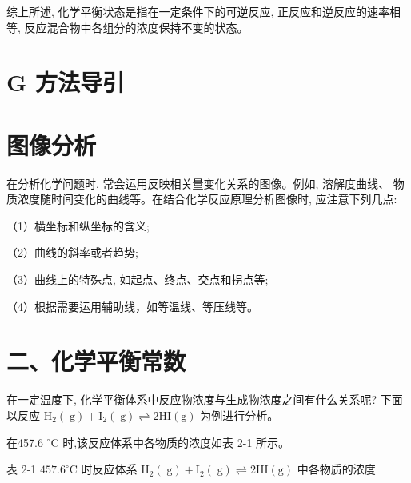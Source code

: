 \documentclass[10pt]{article}
\begin{document}
综上所述, 化学平衡状态是指在一定条件下的可逆反应, 正反应和逆反应的速率相等, 反应混合物中各组分的浓度保持不变的状态。

\section*{G 方法导引}

\section*{图像分析}

在分析化学问题时, 常会运用反映相关量变化关系的图像。例如, 溶解度曲线、 物质浓度随时间变化的曲线等。在结合化学反应原理分析图像时, 应注意下列几点:

（1）横坐标和纵坐标的含义;

（2）曲线的斜率或者趋势;

（3）曲线上的特殊点, 如起点、终点、交点和拐点等;

（4）根据需要运用辅助线，如等温线、等压线等。

\section*{二、化学平衡常数}

在一定温度下, 化学平衡体系中反应物浓度与生成物浓度之间有什么关系呢? 下面以反应 \({\mathrm{H}}_{2}\left( \mathrm{\;g}\right) + {\mathrm{I}}_{2}\left( \mathrm{\;g}\right) \rightleftharpoons 2\mathrm{{HI}}\left( \mathrm{g}\right)\) 为例进行分析。

在457.6 \({}^{ \circ }\mathrm{C}\) 时,该反应体系中各物质的浓度如表 2-1 所示。

表 2-1 \({457.6}^{ \circ }\mathrm{C}\) 时反应体系 \({\mathrm{H}}_{2}\left( \mathrm{\;g}\right) + {\mathrm{I}}_{2}\left( \mathrm{\;g}\right) \rightleftharpoons 2\mathrm{{HI}}\left( \mathrm{g}\right)\) 中各物质的浓度
\end{document}
